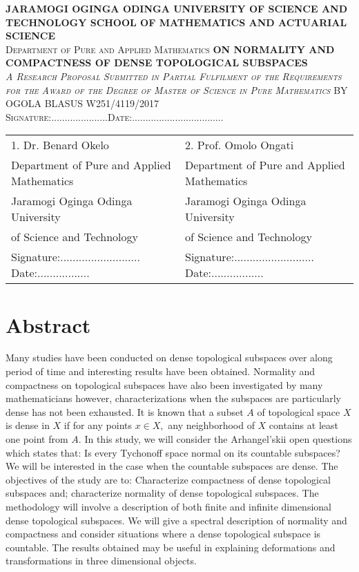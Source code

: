 \documentclass[PhD,14,a4paper]{report}
\theoremstyle{plain}
\theoremstyle{definition}
\theoremstyle{remark}
\numberwithin{figure}{section}
\numberwithin{equation}{subsection}
\begin{document}
{\begin{titlepage}
 \begin{center}
\textsc{\textbf{ JARAMOGI OGINGA ODINGA UNIVERSITY OF SCIENCE AND TECHNOLOGY \vskip 17mm SCHOOL OF MATHEMATICS AND ACTUARIAL SCIENCE}\\
\vskip 18mm
Department of  Pure and Applied  Mathematics }\vskip 17mm
\textbf{ ON NORMALITY AND COMPACTNESS OF DENSE TOPOLOGICAL SUBSPACES }\\
\vskip 15mm \textsc{\emph{ A Research Proposal Submitted in Partial Fulfilment of the Requirements for the Award of the Degree of Master of Science in Pure Mathematics}
\vskip 15mm
BY\vskip 5mm OGOLA BLASUS \vskip 1mm W251/4119/2017\\
\vskip 5mm
Signature:.....................Date:..................................}\\
\vskip 19mm \flushleft {}\vskip 8mm
\begin{tabular}{ll}
1. Dr. Benard Okelo& 2. Prof.  Omolo Ongati\\
Department of Pure and Applied Mathematics  &Department of Pure and Applied Mathematics\\
Jaramogi Oginga Odinga University&Jaramogi Oginga Odinga University  \\
of Science and Technology& of Science and Technology\\
 Signature:.......................... Date:.................&Signature:.......................... Date:.................
\end{tabular}
\end{center}

\end{titlepage}
\newpage
\tableofcontents {}
\newpage 
\section*{ Abstract}
\noindent Many studies have been conducted on dense topological   subspaces over along  period of time and interesting results have been  obtained. Normality and compactness on  topological  subspaces have also been investigated by many mathematicians however, characterizations when the subspaces are particularly dense has not been exhausted.  It is known  that a subset $A$ of topological  space $X$ is dense in $X$ if for any points $x \in X,$ any neighborhood of $X$ contains at least one point from $A.$  In this study, we will consider the Arhangel'skii  open questions which states that: Is every Tychonoff space normal on its countable subspaces? We will be interested in the case when the countable subspaces are dense.  The objectives of the study are to: Characterize  compactness of dense topological subspaces and; characterize  normality of dense topological subspaces. The methodology will involve  a description of  both finite and infinite dimensional dense topological subspaces. We will give a spectral description of normality and compactness and consider situations where a dense topological subspace is countable. The results obtained may be useful in explaining deformations and transformations in three dimensional objects.
\newpage
}
\end{document}
